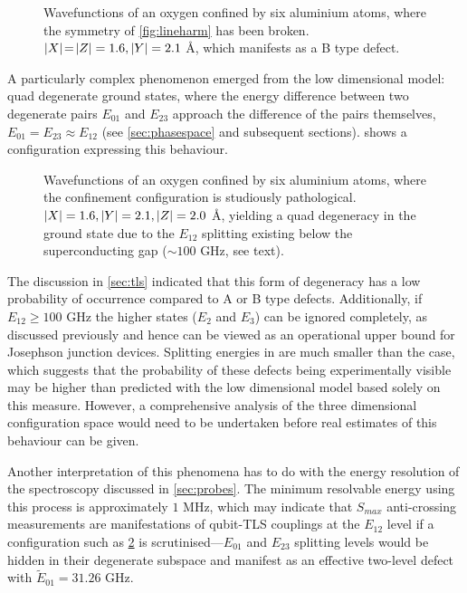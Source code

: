 \begin{figure}[htp]
  \resizebox{\textwidth}{!}{}
  \caption[B Type Defect Configuration]{\label{fig:lineb}Wavefunctions of an oxygen confined by six aluminium atoms, where the symmetry of \cref{fig:lineharm} has been broken. $\lvert X\rvert\!=\!\lvert Z\rvert = 1.6, \lvert Y\rvert = 2.1$ \AA, which manifests as a B type defect.}
\end{figure}

A particularly complex phenomenon emerged from the low dimensional model: quad degenerate ground states, where the energy difference between two degenerate pairs $E_{01}$ and $E_{23}$ approach the difference of the pairs themselves, \ie $E_{01} = E_{23} \approx E_{12}$ (see \cref{sec:phasespace} and subsequent sections).
 shows a configuration expressing this behaviour.

\begin{figure}[htp]
  \resizebox{\textwidth}{!}{}
  \caption[Quad Degeneracy Configuration]{\label{fig:linequad}Wavefunctions of an oxygen confined by six aluminium atoms, where the confinement configuration is studiously pathological. $\lvert X\rvert = 1.6, \lvert Y\rvert = 2.1, \lvert Z\rvert = 2.0$ \AA, yielding a quad degeneracy in the ground state due to the $E_{12}$ splitting existing below the superconducting gap ($\sim\! 100$ GHz, see text).  }
\end{figure}

The discussion in \cref{sec:tls} indicated that this form of degeneracy has a low probability of occurrence compared to A or B type defects.
Additionally, if $E_{12} \geq 100$ GHz the higher states ($E_{2}$ and $E_{3}$) can be ignored completely, as discussed previously and hence can be viewed as an operational upper bound for Josephson junction devices.
Splitting energies in  are much smaller than the  case, which suggests that the probability of these defects being experimentally visible may be higher than predicted with the low dimensional model based solely on this measure.
However, a comprehensive analysis of the three dimensional configuration space would need to be undertaken before real estimates of this behaviour can be given.

Another interpretation of this phenomena has to do with the energy resolution of the spectroscopy discussed in \cref{sec:probes}.
The minimum resolvable energy using this process is approximately $1$ MHz, which may indicate that $S_{max}$ anti-crossing measurements are manifestations of qubit-TLS couplings at the $E_{12}$ level if a configuration such as \cref{fig:linequad} is scrutinised---$E_{01}$ and $E_{23}$ splitting levels would be hidden in their degenerate subspace and manifest as an effective two-level defect with $\widetilde{E}_{01} = 31.26$ GHz.

